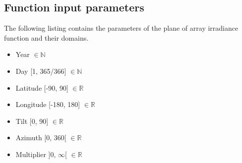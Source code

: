 
\subsection{Function input parameters} 
The following listing contains the parameters of the plane of array irradiance function and their domains.

\begin{itemize}
	\item Year $\in \mathbb{N}$
	\item Day [1, 365/366] $\in \mathbb{N}$
	\item Latitude [-90, 90] $\in \mathbb{R}$%
	\item Longitude [-180, 180]  $\in \mathbb{R}$%
  	\item Tilt [0, 90] $\in \mathbb{R}$
  	\item Azimuth [0, 360[ $\in \mathbb{R}$
  	\item Multiplier ]0, $\infty$[ $\in \mathbb{R}$
\end{itemize}

